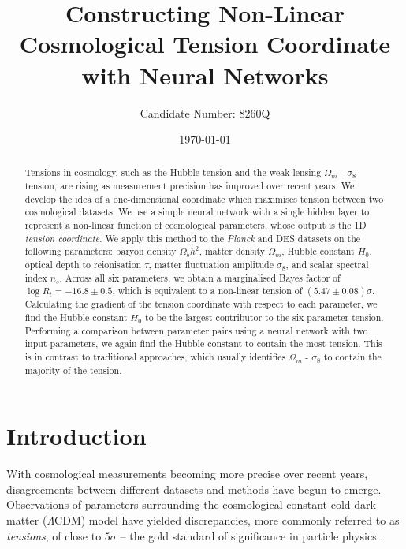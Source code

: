 \documentclass[%
 reprint,
 amsmath,amssymb,
 aps,
]{revtex4-2}
\begin{document}

\title{Constructing Non-Linear Cosmological Tension Coordinate with Neural Networks}

\author{Candidate Number: 8260Q}


\date{\today}

\begin{abstract}
Tensions in cosmology, such as the Hubble tension and the weak lensing $\Omega_m$ - $\sigma_8$ tension, are rising as measurement precision has improved over recent years. We develop the idea of a one-dimensional coordinate which maximises tension between two cosmological datasets. We use a simple neural network with a single hidden layer to represent a non-linear function of cosmological parameters, whose output is the 1D \textit{tension coordinate}. We apply this method to the \textit{Planck} and DES datasets on the following parameters: baryon density $\Omega_b h^2$, matter density $\Omega_m$, Hubble constant $H_0$, optical depth to reionisation $\tau$, matter fluctuation amplitude $\sigma_8$, and scalar spectral index $n_s$. Across all six parameters, we obtain a marginalised Bayes factor of $\log R_t = -16.8 \pm 0.5$, which is equivalent to a non-linear tension of $(5.47 \pm 0.08)\sigma$. Calculating the gradient of the tension coordinate with respect to each parameter, we find the Hubble constant $H_0$ to be the largest contributor to the six-parameter tension. Performing a comparison between parameter pairs using a neural network with two input parameters, we again find the Hubble constant to contain the most tension. This is in contrast to traditional approaches, which usually identifies $\Omega_m$ - $\sigma_8$ to contain the majority of the tension.

\end{abstract}

\maketitle



\section{Introduction} \label{intro}

With cosmological measurements becoming more precise over recent years, disagreements between different datasets and methods have begun to emerge. Observations of parameters surrounding the cosmological constant cold dark matter ($\Lambda \textrm{CDM}$) model have yielded discrepancies, more commonly referred to as \textit{tensions}, of close to $5\sigma$ -- the gold standard of significance in particle physics \cite{Franklin2013}. 
\end{document}
